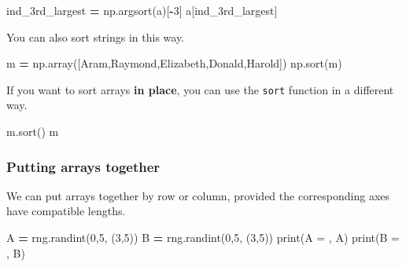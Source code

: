 \documentclass[
  letterpaper,
]{scrbook}
\newenvironment{Shaded}{\begin{snugshade}}{\end{snugshade}}
\newcommand{\BuiltInTok}[1]{#1}
\newcommand{\DecValTok}[1]{\textcolor[rgb]{0.00,0.00,0.81}{#1}}
\newcommand{\NormalTok}[1]{#1}
\newcommand{\OperatorTok}[1]{\textcolor[rgb]{0.81,0.36,0.00}{\textbf{#1}}}
\newcommand{\StringTok}[1]{\textcolor[rgb]{0.31,0.60,0.02}{#1}}
\begin{document}
\begin{Shaded}
\begin{Highlighting}[]
\NormalTok{ind\_3rd\_largest }\OperatorTok{=}\NormalTok{ np.argsort(a)[}\OperatorTok{{-}}\DecValTok{3}\NormalTok{]}
\NormalTok{a[ind\_3rd\_largest]}
\end{Highlighting}
\end{Shaded}

You can also sort strings in this way.

\begin{Shaded}
\begin{Highlighting}[]
\NormalTok{m }\OperatorTok{=}\NormalTok{ np.array([}\StringTok{\textquotesingle{}Aram\textquotesingle{}}\NormalTok{,}\StringTok{\textquotesingle{}Raymond\textquotesingle{}}\NormalTok{,}\StringTok{\textquotesingle{}Elizabeth\textquotesingle{}}\NormalTok{,}\StringTok{\textquotesingle{}Donald\textquotesingle{}}\NormalTok{,}\StringTok{\textquotesingle{}Harold\textquotesingle{}}\NormalTok{])}
\NormalTok{np.sort(m)}
\end{Highlighting}
\end{Shaded}

If you want to sort arrays \textbf{in place}, you can use the \texttt{sort} function in a different way.

\begin{Shaded}
\begin{Highlighting}[]
\NormalTok{m.sort()}
\NormalTok{m}
\end{Highlighting}
\end{Shaded}

\hypertarget{putting-arrays-together}{%
\subsubsection{Putting arrays together}\label{putting-arrays-together}}

We can put arrays together by row or column, provided the corresponding axes have compatible lengths.

\begin{Shaded}
\begin{Highlighting}[]
\NormalTok{A }\OperatorTok{=}\NormalTok{ rng.randint(}\DecValTok{0}\NormalTok{,}\DecValTok{5}\NormalTok{, (}\DecValTok{3}\NormalTok{,}\DecValTok{5}\NormalTok{))}
\NormalTok{B }\OperatorTok{=}\NormalTok{ rng.randint(}\DecValTok{0}\NormalTok{,}\DecValTok{5}\NormalTok{, (}\DecValTok{3}\NormalTok{,}\DecValTok{5}\NormalTok{))}
\BuiltInTok{print}\NormalTok{(}\StringTok{\textquotesingle{}A = \textquotesingle{}}\NormalTok{, A)}
\BuiltInTok{print}\NormalTok{(}\StringTok{\textquotesingle{}B = \textquotesingle{}}\NormalTok{, B)}
\end{Highlighting}
\end{Shaded}
\end{document}
